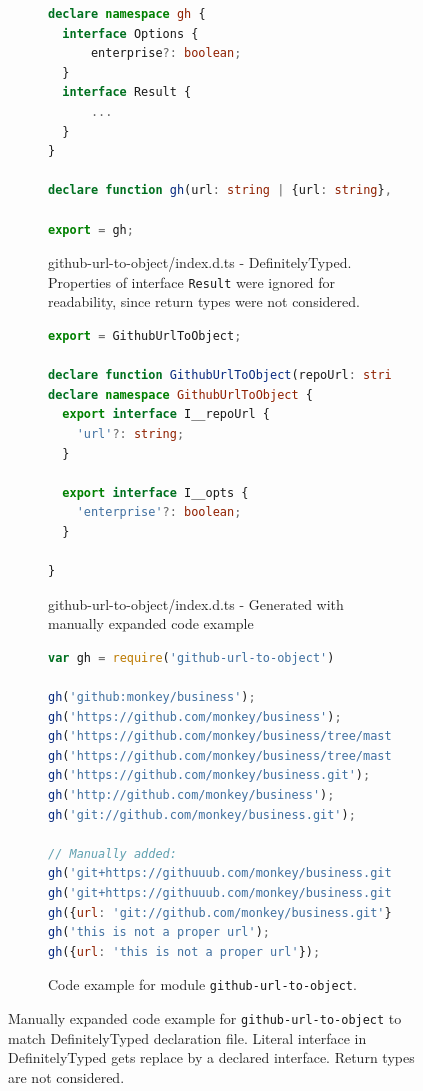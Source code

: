 \documentclass[english,cleveref,autoref,submission]{programming}
\begin{document}
\begin{figure}[tp]
  \centering
  \begin{subfigure}{0.45\linewidth}
    \begin{lstlisting}[language=TypeScript]
declare namespace gh {
  interface Options {
      enterprise?: boolean;
  }
  interface Result {
      ...
  }
}

declare function gh(url: string | {url: string}, options?: gh.Options): gh.Result | null;

export = gh;    
    \end{lstlisting}
    \caption{github-url-to-object/index.d.ts - DefinitelyTyped. Properties of interface \texttt{Result} were ignored for readability, since return types were not considered.}
  \end{subfigure}
  \hfill
  \begin{subfigure}{0.45\linewidth}
    \begin{lstlisting}[language=TypeScript]
export = GithubUrlToObject;

declare function GithubUrlToObject(repoUrl: string | GithubUrlToObject.I__repoUrl, opts?: GithubUrlToObject.I__opts): object | null;
declare namespace GithubUrlToObject {
  export interface I__repoUrl {
    'url'?: string;
  }

  export interface I__opts {
    'enterprise'?: boolean;
  }

}
    \end{lstlisting}
    \caption{github-url-to-object/index.d.ts - Generated with manually expanded code example}
  \end{subfigure}

  \begin{subfigure}{0.80\linewidth}
    \begin{lstlisting}[language=JavaScript]
var gh = require('github-url-to-object')

gh('github:monkey/business');
gh('https://github.com/monkey/business');
gh('https://github.com/monkey/business/tree/master');
gh('https://github.com/monkey/business/tree/master/nested/file.js');
gh('https://github.com/monkey/business.git');
gh('http://github.com/monkey/business');
gh('git://github.com/monkey/business.git');

// Manually added:
gh('git+https://githuuub.com/monkey/business.git', {});
gh('git+https://githuuub.com/monkey/business.git', {enterprise: true});
gh({url: 'git://github.com/monkey/business.git'});
gh('this is not a proper url');
gh({url: 'this is not a proper url'});
    \end{lstlisting}
    \caption{Code example for module \texttt{github-url-to-object}.}
    \end{subfigure}
  \caption{Manually expanded code example for \texttt{github-url-to-object} to match DefinitelyTyped declaration file. Literal interface in DefinitelyTyped gets replace by a declared interface. Return types are not considered.}
  \label{fig:experiments-results-manually-completed-examples}
\end{figure}
\end{document}
